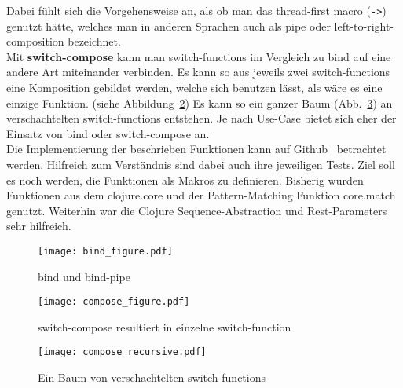 \documentclass[10pt,journal,compsoc]{IEEEtran}
\begin{document}
  Dabei fühlt sich die Vorgehensweise an, als ob man das thread-first macro (\texttt{->}) genutzt hätte, welches man in anderen Sprachen auch als pipe oder left-to-right-composition bezeichnet.\\
  Mit \textbf{switch-compose} kann man switch-functions im Vergleich zu bind auf eine andere Art miteinander verbinden.
  Es kann so aus jeweils zwei switch-functions eine Komposition gebildet werden, welche sich benutzen lässt, als wäre es eine einzige Funktion. (siehe Abbildung~\ref{fig:compose})
  Es kann so ein ganzer Baum (Abb.~\ref{fig:compose_recursive}) an verschachtelten switch-functions entstehen.
  Je nach Use-Case bietet sich eher der Einsatz von bind oder switch-compose an.\\
  Die Implementierung der beschrieben Funktionen kann auf Github~\cite{ropclojure} betrachtet werden.
  Hilfreich zum Verständnis sind dabei auch ihre jeweiligen Tests.
  Ziel soll es noch werden, die Funktionen als Makros zu definieren.
  Bisherig wurden Funktionen aus dem clojure.core und der Pattern-Matching Funktion core.match~\cite{corematch} genutzt.
  Weiterhin war die Clojure Sequence-Abstraction und Rest-Parameters sehr hilfreich.

  \begin{figure}[h]
    \centering
    \vspace{-.5cm}
    \texttt{[image: bind\_figure.pdf]}
    \caption{bind und bind-pipe}\label{fig:bind}
  \end{figure}
  \begin{figure}[h]
    \centering
    \vspace{-.3cm}
    \texttt{[image: compose\_figure.pdf]}
    \caption{switch-compose resultiert in einzelne switch-function}\label{fig:compose}
  \end{figure}
  \begin{figure}
    \centering
    \texttt{[image: compose\_recursive.pdf]}
    \caption{Ein Baum von verschachtelten switch-functions}\label{fig:compose_recursive}
  \end{figure}
\end{document}
